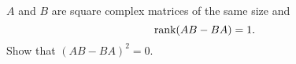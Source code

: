 \documentclass{article}
\begin{document}
\setlength{\parindent}{0pt}
$A$ and $B$ are square complex matrices of the same size and$$\textup{rank}(AB-BA)=1.$$Show that $(AB-BA)^{2}=0$.
\end{document}
